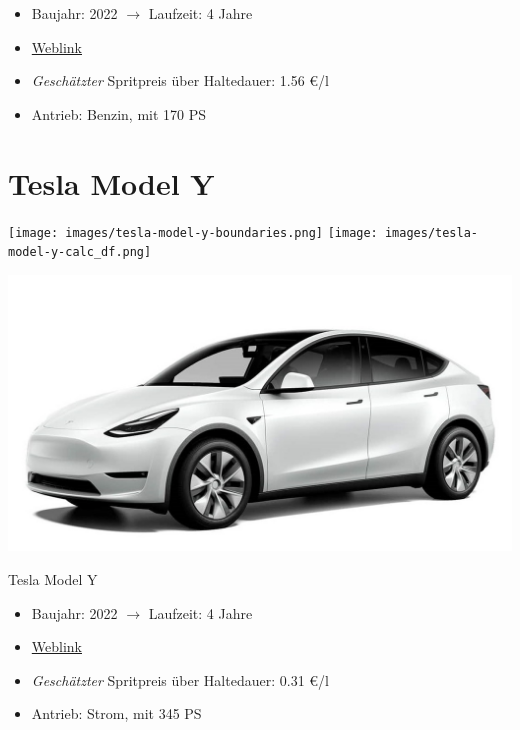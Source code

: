 \documentclass[landscape, DIV=99, 14pt]{scrartcl}
\begin{document}
\begin{itemize}
    \item Baujahr: 2022 $\rightarrow$ Laufzeit: 4 Jahre
    \item \href{https://konfigurator.meinauto.de/mercedes/neuwagen/c-klasse/angebote/c-klasse-t-modell/konfigurator/\#!/preisvergleich/-/8866563/2,47,74,81/private/43735-7309-290394/349/61d36ce4c3067/cash-purchase/73169--190162/48,0,10000,0,0,0,0,0,}{Weblink}
    \item \emph{Gesch\"atzter} Spritpreis \"uber Haltedauer: 1.56 \euro{}/l
    \item Antrieb: Benzin, mit 170 PS
\end{itemize}

\pagebreak


\twocolumn

\section*{Tesla Model Y}
\begin{center}
\texttt{[image: images/tesla-model-y-boundaries.png]}
\null
\vspace{0.5cm}
\texttt{[image: images/tesla-model-y-calc\_df.png]}
\end{center}

\pagebreak
\null
\vspace{2cm}
\begin{center}
\includegraphics[width=0.9\columnwidth]{cars/tesla-model-y.jpg}

Tesla Model Y
\end{center}

\begin{itemize}
    \item Baujahr: 2022 $\rightarrow$ Laufzeit: 4 Jahre
    \item \href{https://www.tesla.com/de_de/modely/design\#overview}{Weblink}
    \item \emph{Gesch\"atzter} Spritpreis \"uber Haltedauer: 0.31 \euro{}/l
    \item Antrieb: Strom, mit 345 PS
\end{itemize}
\end{document}
